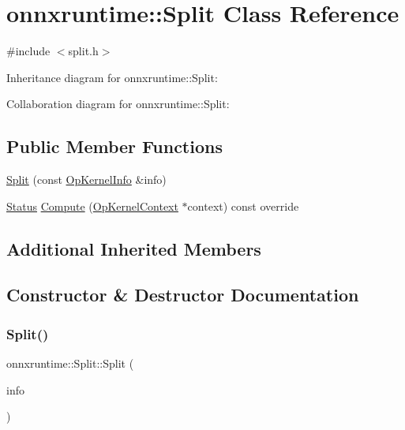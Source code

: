 \hypertarget{classonnxruntime_1_1Split}{}\section{onnxruntime\+:\+:Split Class Reference}
\label{classonnxruntime_1_1Split}


{\ttfamily \#include $<$split.\+h$>$}



Inheritance diagram for onnxruntime\+:\+:Split\+:


Collaboration diagram for onnxruntime\+:\+:Split\+:
\subsection*{Public Member Functions}
\begin{DoxyCompactItemize}
\item 
\mbox{\hyperlink{classonnxruntime_1_1Split_a53f62fe4992451abbe050a5e1d02f542}{Split}} (const \mbox{\hyperlink{classonnxruntime_1_1OpKernelInfo}{Op\+Kernel\+Info}} \&info)
\item 
\mbox{\hyperlink{classonnxruntime_1_1common_1_1Status}{Status}} \mbox{\hyperlink{classonnxruntime_1_1Split_ae059546d2b4177502aba420a52865d4f}{Compute}} (\mbox{\hyperlink{classonnxruntime_1_1OpKernelContext}{Op\+Kernel\+Context}} $\ast$context) const override
\end{DoxyCompactItemize}
\subsection*{Additional Inherited Members}


\subsection{Constructor \& Destructor Documentation}
\mbox{\label{classonnxruntime_1_1Split_a53f62fe4992451abbe050a5e1d02f542}} 
\subsubsection{\texorpdfstring{Split()}{Split()}}
{\footnotesize\ttfamily onnxruntime\+::\+Split\+::\+Split (\begin{DoxyParamCaption}\item[{const \mbox{\hyperlink{classonnxruntime_1_1OpKernelInfo}{Op\+Kernel\+Info}} \&}]{info }\end{DoxyParamCaption})\hspace{0.3cm}{\ttfamily [inline]}}



